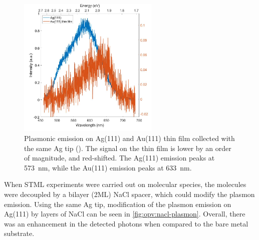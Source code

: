
\begin{figure} [h]
    \centering
    \includegraphics[width=0.6\textwidth]{pictures/Ag_Au_plasmon_3V_200pA_10s.jpg}
    \caption{Plasmonic emission on Ag(111) and Au(111) thin film collected with the same Ag tip (). The signal on the thin film is lower by an order of magnitude, and red-shifted. The Ag(111) emission peaks at \SI{573}{nm}, while the Au(111) emission peaks at \SI{633}{nm}.}
    \label{fig:opv:metal-plasmon}
\end{figure}



When \ac{STML} experiments were carried out on molecular species, the molecules were decoupled by a bilayer (2\ac{ML}) NaCl spacer, which could modify the plasmon emission. Using the same Ag tip, modification of the plasmon emission on Ag(111) by layers of NaCl can be seen in \autoref{fig:opv:nacl-plasmon}. Overall, there was an enhancement in the detected photons when compared to the bare metal substrate.


